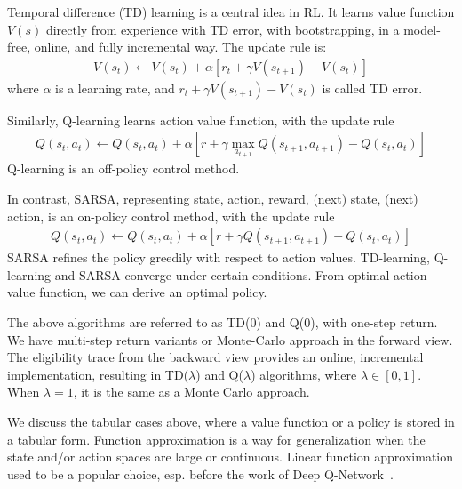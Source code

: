 Temporal difference (TD) learning is a central idea in RL. It learns value function $V(s)$ directly from experience with TD error, with bootstrapping, in a model-free, online, and fully incremental way. 
The update rule is:
\begin{align*}
 V(s_t) \leftarrow V(s_t) + \alpha [r_t + \gamma V(s_{t+1}) - V(s_t)]   
\end{align*}
where $\alpha$ is a learning rate, and $r_t + \gamma V(s_{t+1}) - V(s_t)$ is called TD error.

Similarly, Q-learning learns action value function, with the update rule
\begin{align*}
 Q(s_t, a_t) \leftarrow Q(s_t, a_t) + \alpha [r + \gamma \max_{a_{t+1}}Q(s_{t+1}, a_{t+1}) - Q(s_t,a_t)]   
\end{align*}
Q-learning is an off-policy control method.

In contrast, SARSA, representing state, action, reward, (next) state, (next) action, is an on-policy control method, with the update rule
\begin{align*}
    Q(s_t, a_t) \leftarrow Q(s_t, a_t) + \alpha [r + \gamma Q(s_{t+1}, a_{t+1}) - Q(s_t,a_t)]
\end{align*}
SARSA refines the policy greedily with respect to action values. TD-learning, Q-learning and SARSA converge under certain conditions. From optimal action value function, we can derive an optimal policy. 

The above algorithms are referred to as TD(0) and Q(0), with one-step return. We have multi-step return variants or Monte-Carlo approach in the forward view. The eligibility trace from the backward view provides an online, incremental implementation, resulting in TD($\lambda$) and Q($\lambda$) algorithms, where $\lambda \in[0,1]$. When $\lambda = 1$, it is the same as a Monte Carlo approach. 

We discuss the tabular cases above, where a value function or a policy is stored in a tabular form. Function approximation is a way for generalization when the state and/or action spaces are large or continuous. Linear function approximation used to be a popular choice, esp. before the work of Deep Q-Network~\citep{Atari}.


